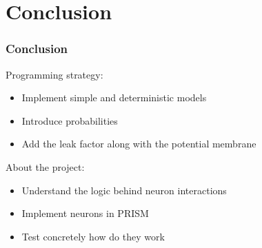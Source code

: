 \section{Conclusion}
\begin{frame}
  \frametitle{Conclusion}

  Programming strategy:

  \begin{itemize}
    \item Implement simple and deterministic models
    \item Introduce probabilities
    \item Add the leak factor along with the potential membrane
  \end{itemize}

  \mysep{}

  About the project:

  \begin{itemize}
    \item Understand the logic behind neuron interactions
    \item Implement neurons in PRISM
    \item Test concretely how do they work
  \end{itemize}

\end{frame}